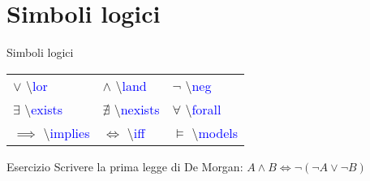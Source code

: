 \section{Simboli logici}
  \begin{frame}{Simboli logici}

	\begin{table}[h!]
	\begin{tabular}{p{2.6cm} p{2.6cm} p{2.6cm}}
	\hline
	$\lor$ \textbackslash \textcolor{blue}{lor} & $\land$ \textbackslash \textcolor{blue}{land} & $\neg$ \textbackslash \textcolor{blue}{neg} \\[0.4cm]
	$\exists$ \textbackslash \textcolor{blue}{exists} & $\nexists$ \textbackslash \textcolor{blue}{nexists} & $\forall$ \textbackslash \textcolor{blue}{forall} \\[0.4cm]
	$\implies$ \textbackslash \textcolor{blue}{implies} & $\iff$ \textbackslash \textcolor{blue}{iff} & $\models$ \textbackslash \textcolor{blue}{models} \\
	\hline
	\end{tabular}
	\end{table}

	\begin{block}{Esercizio}
	Scrivere la prima legge di De Morgan: $A \land B \iff \neg (\neg A \lor \neg B)$
	\end{block}

\end{frame}
